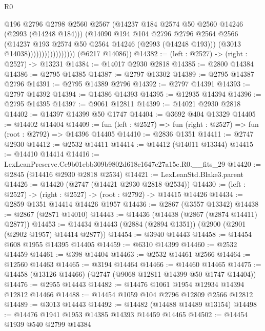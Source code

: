 \begin{lexlean}{R0}
\begin{coremodule}
                                    @196
                                    @2796
                                    @2798
                                    @2560
                                    @2567
                                    (@14237 @184 @2574 @50 @2560 @14246 (@2993 (@14248 @184)))
                                    (@14090
                                      @194
                                      @104
                                      @2796
                                      @2796
                                      @2564
                                      @2566
                                      (@14237 @193 @2574 @50 @2564 @14246 (@2993 (@14248 @193)))
                                      (@3013 @14038)))))))))))))))))
      (@6217 @14086))
@14382 := (left : @2527) -> (right : @2527) -> @13231
@14384 := @14017 @2930 @2818
@14385 := @2800 @14384
@14386 := @2795 @14385
@14387 := @2797 @13302
@14389 := @2795 @14387 @2796
@14391 := @2795 @14389 @2796
@14392 := @2797 @14391
@14393 := @2797 @14392
@14394 := @14386 @14393
@14395 := @12935 @14394
@14396 := @2795 @14395
@14397 := @9061 @12811
@14399 := @14021 @2930 @2818
@14402 := @14397 @14399 @50 @1747
@14404 := @3692 @404 @13329
@14405 := @14402 @14404
@14409 := fun (left : @2527) => fun (right : @2527) => fun (root : @2792) => @14396 @14405
@14410 := @2836 @1351
@14411 := @2747 @2930
@14412 := @2532 @14411
@14414 := @14412 (@14011 @13344)
@14415 := @14410 @14414
@14416 := LexLeanPreserve.Ce9b01ebb309b9802d618c1647c27a15e.R0.__fits_29
@14420 := @2845 (@14416 @2930 @2818 @2534)
@14421 := LexLeanStd.Blake3.parent
@14426 := @14420 (@2747 (@14421 @2930 @2818 @2534))
@14430 := (left : @2527) -> (right : @2527) -> (root : @2792) -> @14415 @14426
@14434 := @2859 @1351 @14414 @14426 @1957
@14436 := @2867 (@3557 @13342)
@14438 := @2867 (@2871 @14010)
@14443 := @14436 (@14438 (@2867 (@2874 @14411) @2877))
@14453 := @14434 @14443 (@2884 (@2894 @1351)) (@2900 (@2901 (@2902 @1957) @14414 @2877))
@14454 := @3940 @14443
@14458 := @14454 @608 @1955 @14395 @14405
@14459 := @6310 @14399
@14460 := @2532 @14459
@14461 := @398 @14404
@14463 := @2532 @14461 @2566
@14464 := @12560 @14463
@14465 := @3194 @14464
@14466 := @14460 @14465
@14475 := @14458 (@13126 @14466) (@2747 (@9068 @12811 @14399 @50 @1747 @14404))
@14476 := @2955 @14443
@14482 := @14476 @1061 @1954 @12934 @14394 @12812 @14466
@14488 := @14454 @1059 @104 @2796 @12809 @2566 @12812
@14489 := @3013 @14443
@14492 := @14482 (@14488 @14489 @13154)
@14498 := @14476 @1941 @1953 @14385 @14393 @14459 @14465
@14502 := @14454 @1939 @540 @2799 @14384

\end{coremodule}
\end{lexlean}
